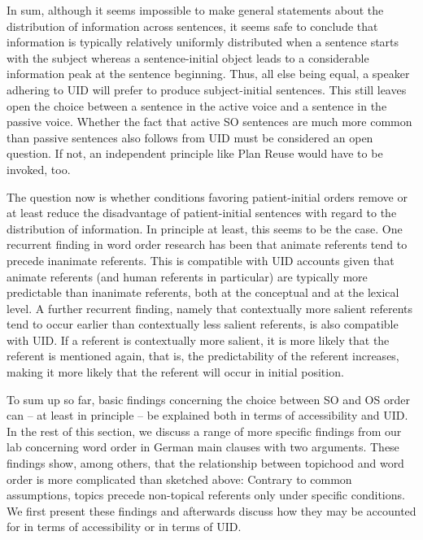 \documentclass[output=paper,colorlinks,citecolor=brown]{langscibook}
\begin{document}
In sum, although it seems impossible to make general statements about the distribution of information across sentences, it seems safe to conclude that information is typically  relatively uniformly distributed when a sentence starts with the subject whereas a sentence-initial object leads to a considerable information peak at the sentence beginning. Thus, all else being equal, a speaker adhering to UID will prefer to produce subject-initial sentences. This still leaves open the choice between a sentence in the active voice and a sentence in the passive voice. Whether the fact that active SO sentences are much more common than passive sentences also follows from UID must be considered an open question. If not, an independent principle like Plan Reuse would have to be invoked, too.

The question now is whether conditions favoring patient-initial orders remove or at least reduce the disadvantage of patient-initial sentences with regard to the distribution of information. In principle at least, this seems to be the case. One recurrent finding in word order research has been that animate referents tend to precede inanimate referents. This is compatible with UID accounts given that animate referents (and human referents in particular) are typically more predictable than inanimate referents, both at the conceptual and at the lexical level. A further recurrent finding, namely that contextually more salient referents tend to occur earlier than contextually less salient referents, is also compatible with UID. If a referent is contextually more salient, it is more likely that the referent is mentioned again, that is, the predictability of the referent increases, making it more likely that the referent will occur in initial position. 

To sum up so far, basic findings concerning the choice between SO and OS order can -- at least in principle -- be explained both in terms of accessibility and UID. In the rest of this section, we discuss a range of more specific findings from our lab concerning word order in German main clauses with two arguments. These findings show, among others, that the relationship between topichood and word order is more complicated than sketched above: Contrary to common assumptions, topics precede non-topical referents only under specific conditions. We first present these findings and afterwards discuss how they may be accounted for in terms of accessibility or in terms of UID. 


\end{document}

